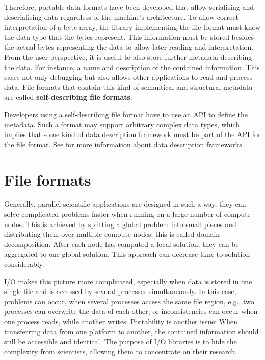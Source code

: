 Therefore, portable data formats have been developed that allow serialising and deserialising data regardless of the machine's architecture.
To allow correct interpretation of a byte array, the library implementing the file format must know the data type that the bytes represent.
This information must be stored besides the actual bytes representing the data to allow later reading and interpretation.
From the user perspective, it is useful to also store further metadata describing the data.
For instance, a name and description of the contained information.
This eases not only debugging but also allows other applications to read and process data.
File formats that contain this kind of semantical and structural metadata are called \textbf{self-describing file formats}.

Developers using a self-describing file format have to use an API to define the metadata.
Such a format may support arbitrary complex data types, which implies that some kind of data description framework must be part of the API for the file format.
See  for more information about data description frameworks.


\section{File formats}
\label{sec: background/file formats}


Generally, parallel scientific applications are designed in such a way, they can solve complicated problems faster when running on a large number of compute nodes.
This is achieved by splitting a global problem into small pieces and distributing them over multiple compute nodes; this is called domain decomposition.
After each node has computed a local solution, they can be aggregated to one global solution.
This approach can decrease time-to-solution considerably.

I/O makes this picture more complicated, especially when data is stored in one single file and is accessed by several processes simultaneously.
In this case, problems can occur, when several processes access the same file region, e.g., two processes can overwrite the data of each other, or inconsistencies can occur when one process reads, while another writes.
Portability is another issue: When transferring data from one platform to another, the contained information should still be accessible and identical.
The purpose of I/O libraries is to hide the complexity from scientists, allowing them to concentrate on their research.



